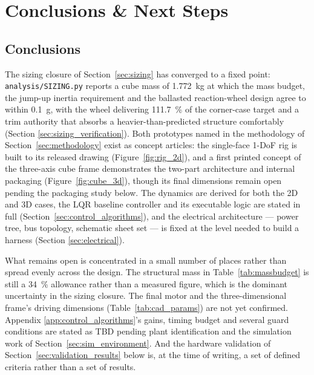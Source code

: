 \section{Conclusions \& Next Steps}
\label{sec:conclusions}

\subsection{Conclusions}
\label{sec:conclusions_summary}

The sizing closure of Section~\ref{sec:sizing} has converged to a fixed point:
\texttt{analysis/SIZING.py} reports a cube mass of \qty{1.772}{\kilo\gram} at
which the mass budget, the jump-up inertia requirement and the ballasted
reaction-wheel design agree to within \qty{0.1}{\gram}, with the wheel
delivering \qty{111.7}{\percent} of the corner-case target and a trim
authority that absorbs a heavier-than-predicted structure comfortably (Section
\ref{sec:sizing_verification}). Both prototypes named in the methodology of
Section~\ref{sec:methodology} exist as concept articles: the single-face 1-DoF
rig is built to its released drawing (Figure~\ref{fig:rig_2d}), and a first
printed concept of the three-axis cube frame demonstrates the two-part
architecture and internal packaging (Figure~\ref{fig:cube_3d}), though its
final dimensions remain open pending the packaging study below. The dynamics
are derived for both the 2D and 3D cases, the LQR baseline controller and its
executable logic are stated in full (Section~\ref{sec:control_algorithms}),
and the electrical architecture --- power tree, bus topology, schematic sheet
set --- is fixed at the level needed to build a harness (Section
\ref{sec:electrical}).

What remains open is concentrated in a small number of places rather than
spread evenly across the design. The structural mass in
Table~\ref{tab:massbudget} is still a \qty{34}{\percent} allowance rather than
a measured figure, which is the dominant uncertainty in the sizing closure.
The final motor and the three-dimensional frame's driving dimensions
(Table~\ref{tab:cad_params}) are not yet confirmed. Appendix
\ref{app:control_algorithms}'s gains, timing budget and several guard
conditions are stated as TBD pending plant identification and the simulation
work of Section~\ref{sec:sim_environment}. And the hardware validation of
Section~\ref{sec:validation_results} below is, at the time of writing, a set
of defined criteria rather than a set of results.

